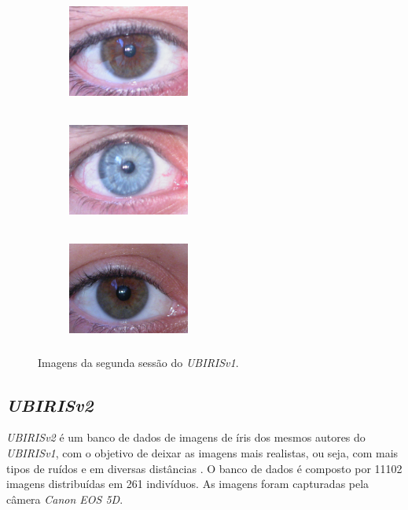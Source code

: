 \begin{figure}[h!]
\begin{subfigure}{.3\textwidth}
\centering
\includegraphics[width=4cm,height=3.5cm]{img/Resultados/ubirisv1/sessao2_1.jpg}
\end{subfigure}\hfill
\begin{subfigure}{.3\textwidth}
\centering
\includegraphics[width=4cm,height=3.5cm]{img/Resultados/ubirisv1/sessao2_55.jpg}
\end{subfigure}\hfill
\begin{subfigure}{.3\textwidth}
\centering
\includegraphics[width=4cm,height=3.5cm]{img/Resultados/ubirisv1/sessao2_76.jpg}
\end{subfigure}
\caption{Imagens da segunda sessão do \textit{UBIRISv1}.}
\label{fig:experimentos:ubirisv1_sessao2}
\end{figure}

\FloatBarrier

\subsection{\textit{UBIRISv2}}\label{sec:experimentos:db:ubirisv2}

\par \textit{UBIRISv2} é um banco de dados de imagens de íris dos mesmos autores do \textit{UBIRISv1}, com o objetivo de deixar as imagens mais realistas, ou seja, com mais tipos de ruídos e em diversas distâncias \cite{proence2010-ubirisv2}. O banco de dados é composto por 11102 imagens distribuídas em 261 indivíduos. As imagens foram capturadas pela câmera \textit{Canon EOS 5D}.

